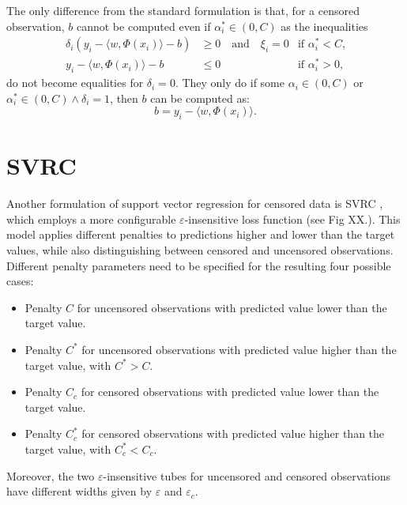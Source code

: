 \documentclass[12pt]{report}
\begin{document}
The only difference from the standard formulation is that, for a censored observation, $b$ cannot be computed even if $\alpha_{i}^{*} \in (0,C)$ as the inequalities
\begin{align}
\label{svcrcompb1}
\delta_{i}(y_{i} - \langle w,\Phi(x_{i})\rangle - b) &\geq 0 \quad \text{and} \quad \xi_{i}=0 &\text{if } \alpha_{i}^{*} < C \text{,}\\
\label{svcrcompb2}
y_{i} - \langle w,\Phi(x_{i})\rangle - b &\leq 0 &\text{if } \alpha_{i}^{*} > 0 \text{,}
\end{align}
do not become equalities for $\delta_{i} = 0$. They only do if some $\alpha_{i} \in (0,C)$ or $\alpha_{i}^{*} \in (0,C) \wedge \delta_{i} = 1$, then $b$ can be computed as:
\begin{equation} \label{svcrcompb3}
b = y_{i} - \langle w,\Phi(x_{i})\rangle \text{.}
\end{equation}

\section{SVRC}
Another formulation of support vector regression for censored data is SVRC \cite{khan08}, which employs a more configurable $\varepsilon$-insensitive loss function (see Fig XX.). This model applies different penalties to predictions higher and lower than the target values, while also distinguishing between censored and uncensored observations. Different penalty parameters need to be specified for the resulting four possible cases:
\begin{itemize}
\item Penalty $C$ for uncensored observations with predicted value lower than the target value.
\item Penalty $C^{*}$ for uncensored observations with predicted value higher than the target value, with $C^{*} > C$.
\item Penalty $C_{c}$ for censored observations with predicted value lower than the target value.
\item Penalty $C_{c}^{*}$ for censored observations with predicted value higher than the target value, with $C_{c}^{*} < C_{c}$.
\end{itemize}
Moreover, the two $\varepsilon$-insensitive tubes for uncensored and censored observations have different widths given by $\varepsilon$ and $\varepsilon_{c}$.
\end{document}
